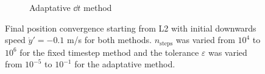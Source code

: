 \begin{figure}[h]
\begin{subfigure}{0.49\linewidth}
        \caption{Adaptative \(\dd t\) method}
        \label{fig:lagrange_conv_adapt}
    \end{subfigure}
    \caption{Final position convergence starting from L2 with initial downwards speed \(\dot y' = -0.1\) m/s for both methods. \(n_\textrm{steps}\) was varied from \(10^4\) to \(10^6\) for the fixed timestep method and the tolerance \(\varepsilon\) was varied from \(10^{-5}\) to \(10^{-1}\) for the adaptative method.}
    \label{fig:lagrange_conv}
\end{figure}
